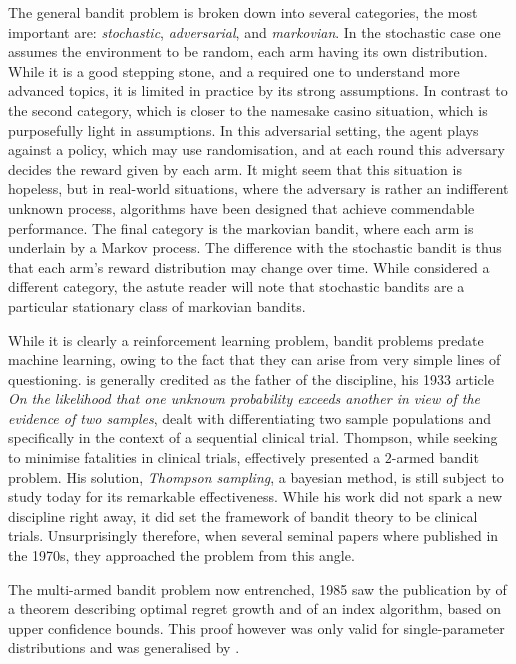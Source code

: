 \par The general bandit problem is broken down into several categories, the most important are: {\em stochastic}, {\em adversarial}, and {\em markovian}. In the stochastic case one assumes the environment to be random, each arm having its own distribution. While it is a good stepping stone, and a required one to understand more advanced topics, it is limited in practice by its strong assumptions. In contrast to the second category, which is closer to the namesake casino situation, which is purposefully light in assumptions. In this adversarial setting, the agent plays against a policy, which may use randomisation, and at each round this adversary decides the reward given by each arm. It might seem that this situation is hopeless, but in real-world situations, where the adversary is rather an indifferent unknown process, algorithms have been designed that achieve commendable performance. The final category is the markovian bandit, where each arm is underlain by a Markov process. The difference with the stochastic bandit is thus that each arm's reward distribution may change over time. While considered a different category, the astute reader will note that stochastic bandits are a particular stationary class of markovian bandits. 

\par While it is clearly a reinforcement learning problem, bandit problems predate machine learning, owing to the fact that they can arise from very simple lines of questioning. \citeauthor{thompson:1933} is generally credited as the father of the discipline, his 1933 article {\em On the likelihood that one unknown probability exceeds another in view of the evidence of two samples}, dealt with differentiating two sample populations and specifically in the context of a sequential clinical trial. Thompson, while seeking to minimise fatalities in clinical trials, effectively presented a $2$-armed bandit problem. His solution, {\em Thompson sampling}, a bayesian method, is still subject to study today for its remarkable effectiveness\cite{agrawal:2012}. While his work did not spark a new discipline right away, it did set the framework of bandit theory to be clinical trials. Unsurprisingly therefore, when several seminal papers where published in the 1970s, they approached the problem from this angle.  %

The multi-armed bandit problem now entrenched, 1985 saw the publication by \citeauthor{lai-robbins:1985} of a theorem describing optimal regret growth and of an index algorithm, based on upper confidence bounds. This proof however was only valid for single-parameter distributions and was generalised by \citet{burnetas:1996}. 

